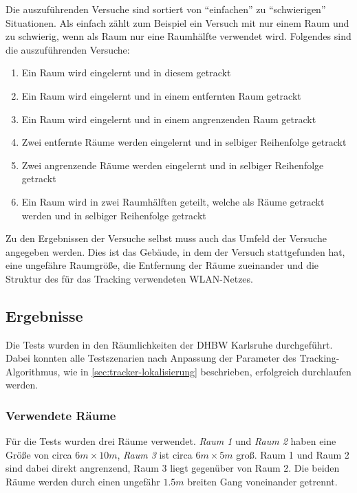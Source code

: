 Die auszuführenden Versuche sind sortiert von \enquote{einfachen} zu \enquote{schwierigen} Situationen.
Als einfach zählt zum Beispiel ein Versuch mit nur einem Raum und zu schwierig, wenn als Raum nur eine
Raumhälfte verwendet wird.
Folgendes sind die auszuführenden Versuche:
\begin{enumerate}[label=\textbf{TS-\arabic*}]
	\item \label{ts:gleicher-raum} Ein Raum wird eingelernt und in diesem getrackt
	\item \label{ts:entfernter-raum} Ein Raum wird eingelernt und in einem entfernten Raum getrackt
	\item \label{ts:angrenzender-raum} Ein Raum wird eingelernt und in einem angrenzenden Raum getrackt
	\item \label{ts:zwei-nacheinander} Zwei entfernte Räume werden eingelernt und in selbiger Reihenfolge getrackt
	\item \label{ts:zwei-angrenzende-nacheinander} Zwei angrenzende Räume werden eingelernt und in selbiger Reihenfolge getrackt
	\item \label{ts:raumhälften} Ein Raum wird in zwei Raumhälften geteilt, welche als Räume getrackt werden und in selbiger Reihenfolge getrackt
\end{enumerate}

Zu den Ergebnissen der Versuche selbst muss auch das Umfeld der Versuche angegeben werden.
Dies ist das Gebäude, in dem der Versuch stattgefunden hat, eine ungefähre Raumgröße, die Entfernung der Räume zueinander
und die Struktur des für das Tracking verwendeten \gls{WLAN}-Netzes.

\subsection{Ergebnisse}

Die Tests wurden in den Räumlichkeiten der \gls{DHBW} Karlsruhe durchgeführt.
Dabei konnten alle Testszenarien nach Anpassung der Parameter des Tracking-Algorithmus, wie
in \autoref{sec:tracker-lokalisierung} beschrieben, erfolgreich durchlaufen werden.

\subsubsection{Verwendete Räume}

Für die Tests wurden drei Räume verwendet. \emph{Raum 1} und \emph{Raum 2} haben eine Größe von
circa $6m\times10m$, \emph{Raum 3} ist circa $6m\times5m$ groß. Raum 1 und Raum 2 sind dabei direkt
angrenzend, Raum 3 liegt gegenüber von Raum 2. Die beiden Räume werden durch einen ungefähr $1.5m$
breiten Gang voneinander getrennt.

